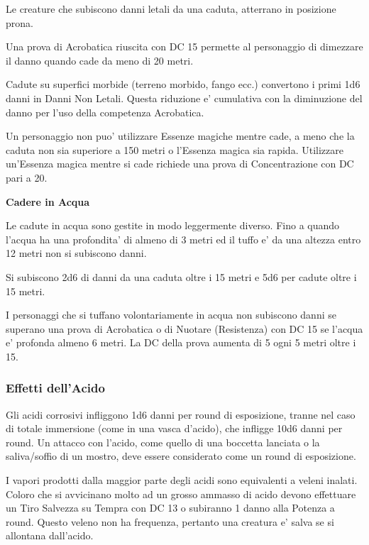 \documentclass[a4paper,11pt,twoside,openany]{book}
\begin{document}
{Le creature che subiscono danni letali da una caduta, atterrano in posizione prona.

Una prova di Acrobatica riuscita con DC 15 permette al personaggio di dimezzare il danno quando cade da meno di 20 metri.

Cadute su superfici morbide (terreno morbido, fango ecc.) convertono i primi 1d6 danni in Danni Non Letali. Questa riduzione e' cumulativa con la diminuzione del danno per l'uso della competenza Acrobatica.

Un personaggio non puo' utilizzare Essenze magiche mentre cade, a meno che la caduta non sia superiore a 150 metri o l'Essenza magica sia rapida. Utilizzare un'Essenza magica mentre si cade richiede una prova di Concentrazione con DC pari a 20.

\textbf{Cadere in Acqua}

Le cadute in acqua sono gestite in modo leggermente diverso. Fino a quando l'acqua ha una profondita' di almeno di 3 metri ed il tuffo e' da una altezza entro 12 metri non si subiscono danni.

Si subiscono 2d6 di danni da una caduta oltre i 15 metri e 5d6 per cadute oltre i 15 metri.

I personaggi che si tuffano volontariamente in acqua non subiscono danni se superano una prova di Acrobatica o di Nuotare (Resistenza) con DC 15 se l'acqua e' profonda almeno 6 metri. La DC della prova aumenta di 5 ogni 5 metri oltre i 15.

\subsubsection{Effetti dell'Acido}

\label{effetti-dellacido}

Gli acidi corrosivi infliggono 1d6 danni per round di esposizione, tranne nel caso di totale immersione (come in una vasca d'acido), che infligge 10d6 danni per round. Un attacco con l'acido, come quello di una boccetta lanciata o la saliva/soffio di un mostro, deve essere considerato come un round di esposizione.

I vapori prodotti dalla maggior parte degli acidi sono equivalenti a veleni inalati. Coloro che si avvicinano molto ad un grosso ammasso di acido devono effettuare un Tiro Salvezza su Tempra con DC 13 o subiranno 1 danno alla Potenza a round. Questo veleno non ha frequenza, pertanto una creatura e' salva se si allontana dall'acido.

}
\end{document}
